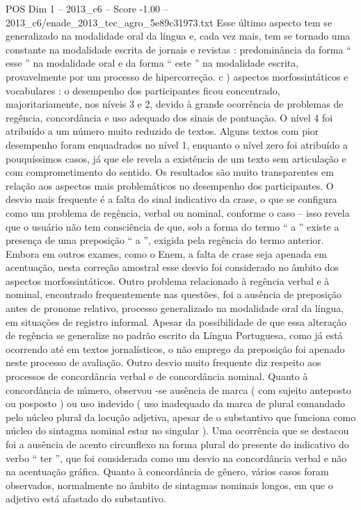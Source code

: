 \begin{textsample}{POS Dim 1 – 2013\_c6 – Score -1.00 – 2013\_c6/enade\_2013\_tec\_agro\_5e89c31973.txt}
Esse último aspecto tem se generalizado na modalidade oral da língua e, cada vez mais, tem se tornado uma constante na modalidade escrita de jornais e revistas : predominância da forma “ esse ” na modalidade oral e da forma “ este ” na modalidade escrita, provavelmente por um processo de hipercorreção. c ) aspectos morfossintáticos e vocabulares : o desempenho dos participantes ficou concentrado, majoritariamente, nos níveis 3 e 2, devido à grande ocorrência de problemas de regência, concordância e uso adequado dos sinais de pontuação.
O nível 4 foi atribuído a um número muito reduzido de textos.
Alguns textos com pior desempenho foram enquadrados no nível 1, enquanto o nível zero foi atribuído a pouquíssimos casos, já que ele revela a existência de um texto sem articulação e com comprometimento do sentido.
Os resultados são muito transparentes em relação aos aspectos mais problemáticos no desempenho dos participantes.
O desvio mais frequente é a falta do sinal indicativo da crase, o que se configura como um problema de regência, verbal ou nominal, conforme o caso – isso revela que o usuário não tem consciência de que, sob a forma do termo “ a ” existe a presença de uma preposição “ a ”, exigida pela regência do termo anterior.
Embora em outros exames, como o Enem, a falta de crase seja apenada em acentuação, nesta correção amostral esse desvio foi considerado no âmbito dos aspectos morfossintáticos.
Outro problema relacionado à regência verbal e à nominal, encontrado frequentemente nas questões, foi a ausência de preposição antes de pronome relativo, processo generalizado na modalidade oral da língua, em situações de registro informal.
Apesar da possibilidade de que essa alteração de regência se generalize no padrão escrito da Língua Portuguesa, como já está ocorrendo até em textos jornalísticos, o não emprego da preposição foi apenado neste processo de avaliação.
Outro desvio muito frequente diz respeito aos processos de concordância verbal e de concordância nominal.
Quanto à concordância de número, observou -se ausência de marca ( com sujeito anteposto ou posposto ) ou uso indevido ( uso inadequado da marca de plural comandado pelo núcleo plural da locução adjetiva, apesar de o substantivo que funciona como núcleo do sintagma nominal estar no singular ).
Uma ocorrência que se destacou foi a ausência de acento circunflexo na forma plural do presente do indicativo do verbo “ ter ”, que foi considerada como um desvio na concordância verbal e não na acentuação gráfica.
Quanto à concordância de gênero, vários casos foram observados, normalmente no âmbito de sintagmas nominais longos, em que o adjetivo está afastado do substantivo.

\end{textsample}
